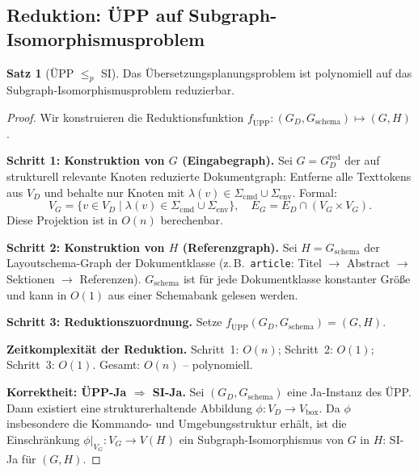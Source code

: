 ﻿\documentclass[a4paper,12pt]{article}
\theoremstyle{definition}
\newtheorem{satz}{Satz}
\begin{document}
\subsection{Reduktion: ÜPP auf Subgraph-Isomorphismusproblem}
\label{sec:ltx-reduktion}

\begin{satz}[ÜPP $\leq_p$ SI]
	\label{satz:ltx-reduktion}
	Das Übersetzungsplanungsproblem ist polynomiell auf das
	Subgraph-Isomorphismusproblem reduzierbar.
\end{satz}

\begin{proof}
	Wir konstruieren die Reduktionsfunktion
	$f_{\mathrm{\ddot{U}PP}}: (G_D, G_{\mathrm{schema}}) \mapsto (G, H)$.
	
	\medskip
	\textbf{Schritt 1: Konstruktion von $G$ (Eingabegraph).}
	Sei $G = G_D^{\mathrm{red}}$ der auf strukturell relevante Knoten
	reduzierte Dokumentgraph: Entferne alle Texttokens aus $V_D$ und behalte
	nur Knoten mit $\lambda(v) \in \Sigma_{\mathrm{cmd}} \cup \Sigma_{\mathrm{env}}$.
	Formal:
	\[
	V_G = \{v \in V_D \mid \lambda(v) \in \Sigma_{\mathrm{cmd}} \cup \Sigma_{\mathrm{env}}\},
	\quad
	E_G = E_D \cap (V_G \times V_G).
	\]
	Diese Projektion ist in $O(n)$ berechenbar.
	
	\medskip
	\textbf{Schritt 2: Konstruktion von $H$ (Referenzgraph).}
	Sei $H = G_{\mathrm{schema}}$ der Layoutsche\-ma-Graph der Dokumentklasse
	(z.\,B.~\texttt{article}: Titel $\to$ Abstract $\to$ Sektionen $\to$
	Referenzen). $G_{\mathrm{schema}}$ ist für jede Dokumentklasse konstanter
	Größe und kann in $O(1)$ aus einer Schemabank gelesen werden.
	
	\medskip
	\textbf{Schritt 3: Reduktionszuordnung.}
	Setze $f_{\mathrm{\ddot{U}PP}}(G_D, G_{\mathrm{schema}}) = (G, H)$.
	
	\medskip
	\textbf{Zeitkomplexität der Reduktion.}
	Schritt~1: $O(n)$; Schritt~2: $O(1)$; Schritt~3: $O(1)$.
	Gesamt: $O(n)$ -- polynomiell. 
	
	\medskip
	\textbf{Korrektheit: ÜPP-Ja $\Rightarrow$ SI-Ja.}
	Sei $(G_D, G_{\mathrm{schema}})$ eine Ja-Instanz des ÜPP. Dann existiert
	eine strukturerhaltende Abbildung $\phi: V_D \to V_{\mathrm{box}}$.
	Da $\phi$ insbesondere die Kommando- und Umgebungsstruktur erhält, ist
	die Einschränkung $\phi|_{V_G}: V_G \to V(H)$ ein Subgraph-Isomorphismus
	von $G$ in $H$: SI-Ja für $(G, H)$.
	

\end{proof}
\end{document}
